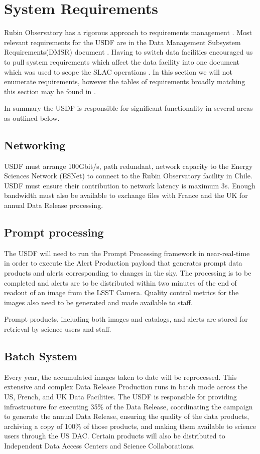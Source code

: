 \section{System Requirements} \label{sec:requirements}

Rubin Observatory has a rigorous approach to requirements management \cite{2016SPIE.9911E..0DS}.
Most relevant requirements for the USDF are in the Data Management Subsystem Requirements(DMSR) document \cite{LSE-61}.
Having to switch data facilities encouraged us to pull system requirements which affect the data facility into one document
which was used to scope the SLAC operations \cite{rtn-080}.
In this section we will not enumerate requirements, however the tables of requirements broadly matching this section may be found in \cite{rtn-080}.

In summary the USDF is responsible for significant functionality in several areas as outlined below.


\subsection{Networking } \label{sec:networking}

USDF must arrange 100Gbit/s, path redundant, network capacity to the Energy Sciences Network (ESNet) to connect to the Rubin Observatory facility in Chile.
USDF must ensure their contribution to network latency is maximum 3s.
Enough bandwidth must also be available to exchange files with France and the UK for annual Data Release processing.

\subsection{Prompt processing} \label{sec:prompproc}
The USDF will need to run the Prompt Processing framework in near-real-time in order to execute the Alert Production payload that generates prompt data products and alerts corresponding to changes in the sky.
The processing is to be completed and alerts are to be distributed within two minutes of the end of readout of an image from the LSST Camera.
Quality control metrics for the images also need to be generated and made available to staff.

Prompt products, including both images and catalogs, and alerts are stored for retrieval by science users and staff.

\subsection{Batch System} \label{sec:offlineprod}
Every year, the accumulated images taken to date will be reprocessed.
This extensive and complex Data Release Production runs in batch mode across the US, French, and UK Data Facilities.
The USDF is responsible for providing infrastructure for executing 35\% of the Data Release, coordinating the campaign to generate the annual Data Release, ensuring the quality of the data products, archiving a copy of 100\% of those products, and making them available to science users through the US DAC.
Certain products will also be distributed to Independent Data Access Centers and Science Collaborations.

